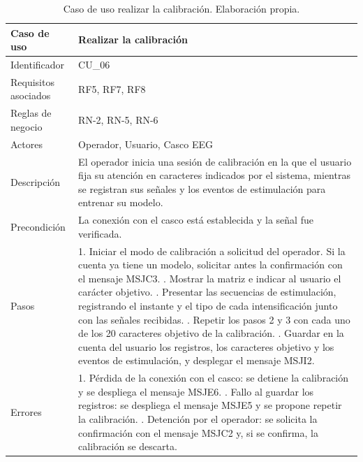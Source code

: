 \begin{table}[H]
\centering
\small
\begin{tabularx}{\textwidth}{|L{3.0cm}|Y|}
\hline
\textbf{Caso de uso} & \textbf{Realizar la calibración} \\
\hline
Identificador & CU\_06 \\
\hline
Requisitos asociados & RF5, RF7, RF8 \\
\hline
Reglas de negocio & RN-2, RN-5, RN-6 \\
\hline
Actores & Operador, Usuario, Casco EEG \\
\hline
Descripción & El operador inicia una sesión de calibración en la que el usuario fija su atención en caracteres indicados por el sistema, mientras se registran sus señales y los eventos de estimulación para entrenar su modelo. \\
\hline
Precondición & La conexión con el casco está establecida y la señal fue verificada. \\
\hline
Pasos & 1. Iniciar el modo de calibración a solicitud del operador. Si la cuenta ya tiene un modelo, solicitar antes la confirmación con el mensaje MSJC3. . Mostrar la matriz e indicar al usuario el carácter objetivo. . Presentar las secuencias de estimulación, registrando el instante y el tipo de cada intensificación junto con las señales recibidas. . Repetir los pasos 2 y 3 con cada uno de los 20 caracteres objetivo de la calibración. . Guardar en la cuenta del usuario los registros, los caracteres objetivo y los eventos de estimulación, y desplegar el mensaje MSJI2. \\
\hline
Errores & 1. Pérdida de la conexión con el casco: se detiene la calibración y se despliega el mensaje MSJE6. . Fallo al guardar los registros: se despliega el mensaje MSJE5 y se propone repetir la calibración. . Detención por el operador: se solicita la confirmación con el mensaje MSJC2 y, si se confirma, la calibración se descarta. \\
\hline
\end{tabularx}
\caption{Caso de uso realizar la calibración. Elaboración propia.}
\label{tab:cu06}
\end{table}

